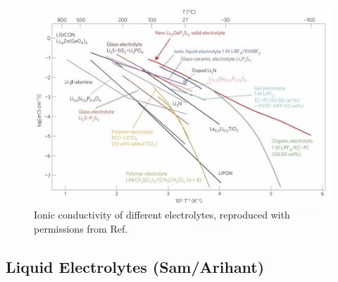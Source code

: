 \documentclass[../main.tex]{subfiles}
\begin{document}
\begin{figure}[htbp]
    \centering
    \includegraphics[scale=0.6]{figures/conductivity.jpg}
    \caption{Ionic conductivity of different electrolytes, reproduced with permissions from Ref. }
    \label{fig:conductivity}
\end{figure}





\subsection{Liquid Electrolytes (Sam/Arihant)}
\label{sec:Liquid_electrolytes}

\end{document}
